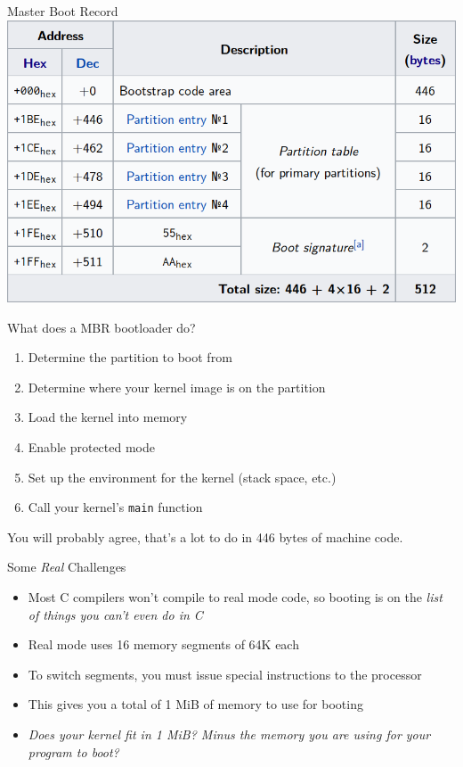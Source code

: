 \documentclass{lug}
\begin{document}
\begin{frame}{Master Boot Record}
    \includegraphics[width=\textwidth]{graphics/mbr_table}
\end{frame}

\begin{frame}{What does a MBR bootloader do?}
    \begin{enumerate}[<+->]
        \item Determine the partition to boot from
        \item Determine where your kernel image is on the partition
        \item Load the kernel into memory
        \item Enable protected mode
        \item Set up the environment for the kernel (stack space, etc.)
        \item Call your kernel's \texttt{main} function
    \end{enumerate}
    \pause[\thebeamerpauses]
    You will probably agree, that's a lot to do in 446 bytes of machine code.
\end{frame}

\begin{frame}{Some \emph{Real} Challenges}
    \begin{itemize}[<+->]
        \item Most C compilers won't compile to real mode code, so booting is
            on the \emph{list of things you can't even do in C}
        \item Real mode uses 16 memory segments of 64K each
        \item To switch segments, you must issue special instructions to the
            processor
        \item This gives you a total of 1 MiB of memory to use for booting
        \item \emph{Does your kernel fit in 1 MiB? Minus the memory you are
            using for your program to boot?}
    \end{itemize}
\end{frame}
\end{document}
